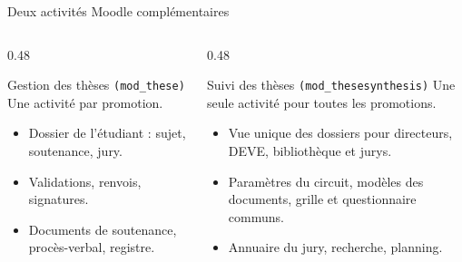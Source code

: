\documentclass[aspectratio=169,11pt]{beamer}
\begin{document}
\begin{frame}{Deux activités Moodle complémentaires}
  \begin{columns}[T]
    \begin{column}{0.48\textwidth}
      \begin{block}{Gestion des thèses \texttt{(mod\_these)}}
        Une activité par promotion.
        \begin{itemize}
          \item Dossier de l'étudiant : sujet, soutenance, jury.
          \item Validations, renvois, signatures.
          \item Documents de soutenance, procès-verbal, registre.
        \end{itemize}
      \end{block}
    \end{column}
    \begin{column}{0.48\textwidth}
      \begin{block}{Suivi des thèses \texttt{(mod\_thesesynthesis)}}
        Une seule activité pour toutes les promotions.
        \begin{itemize}
          \item Vue unique des dossiers pour directeurs, DEVE, bibliothèque et jurys.
          \item Paramètres du circuit, modèles des documents, grille et questionnaire communs.
          \item Annuaire du jury, recherche, planning.
        \end{itemize}
      \end{block}
    \end{column}
  \end{columns}
\end{frame}
\end{document}
